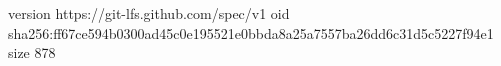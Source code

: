 version https://git-lfs.github.com/spec/v1
oid sha256:ff67ce594b0300ad45c0e195521e0bbda8a25a7557ba26dd6c31d5c5227f94e1
size 878

